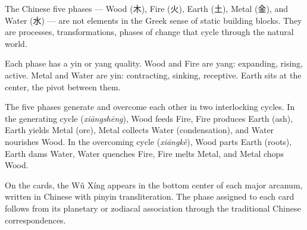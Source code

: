 \documentclass[openright]{book}
\begin{document}
\newpage

\noindent The Chinese five phases --- Wood ({\cjkfont 木}), Fire ({\cjkfont 火}), Earth ({\cjkfont 土}), Metal ({\cjkfont 金}), and Water ({\cjkfont 水}) --- are not elements in the Greek sense of static building blocks. They are processes, transformations, phases of change that cycle through the natural world.

Each phase has a yin or yang quality. Wood and Fire are yang: expanding, rising, active. Metal and Water are yin: contracting, sinking, receptive. Earth sits at the center, the pivot between them.

The five phases generate and overcome each other in two interlocking cycles. In the generating cycle (\textit{xiāngshēng}), Wood feeds Fire, Fire produces Earth (ash), Earth yields Metal (ore), Metal collects Water (condensation), and Water nourishes Wood. In the overcoming cycle (\textit{xiāngkè}), Wood parts Earth (roots), Earth dams Water, Water quenches Fire, Fire melts Metal, and Metal chops Wood.

On the cards, the Wǔ Xíng appears in the bottom center of each major arcanum, written in Chinese with pinyin transliteration. The phase assigned to each card follows from its planetary or zodiacal association through the traditional Chinese correspondences.
\end{document}
